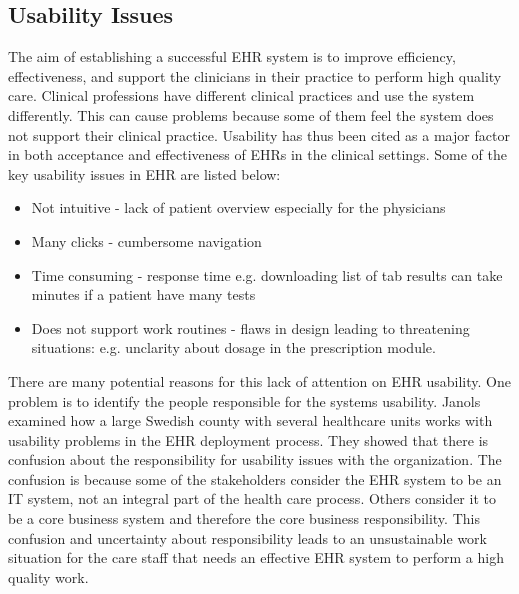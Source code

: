 \documentclass[14pt]{article}
\begin{document}
\subsection{Usability Issues}
\label{sec:futureUsability}
The aim of establishing a successful \gls{EHR} system is to improve efficiency, effectiveness, and support the clinicians in their practice to perform high quality care. Clinical professions have different clinical practices and use the system differently. This can cause problems because some of them feel the system does not support their clinical practice. Usability has thus been cited as a major factor in both acceptance and effectiveness of \gls{EHR}s in the clinical settings. Some of the key usability issues in \gls{EHR} are listed below:
\begin{itemize}
\item Not intuitive - lack of patient overview especially for the physicians\cite{Janols}
\item Many clicks - cumbersome navigation\cite{Janols}
\item Time consuming - response time e.g. downloading list of tab results can take minutes if a patient have many tests\cite{Janols}
\item Does not support work routines - flaws in design leading to threatening situations:  e.g. unclarity about dosage in the  prescription module.\cite{Janols}
\end{itemize}

There are many potential reasons for this lack of attention on \gls{EHR} usability. One problem is to identify the people responsible for the systems usability. Janols \cite{Janols} examined how a large Swedish county with several healthcare units works with usability problems in the \gls{EHR} \cite{Janols} deployment process. They showed that there is confusion about the responsibility for usability issues with the organization. The confusion is because some of the stakeholders consider the \gls{EHR} system to be an IT system, not an integral part of the health care process. Others consider it to be a core business system and therefore the core business responsibility. This confusion and uncertainty about responsibility leads to an unsustainable work situation for the care staff that needs an effective \gls{EHR} system to perform a high quality work.
\end{document}
